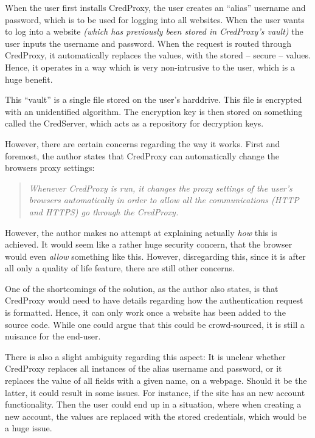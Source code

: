 			When the user first installs CredProxy, the user creates an ``alias'' username and password, which is to be used for logging into all websites. When the user wants to log into a website \emph{(which has previously been stored in CredProxy's vault)} the user inputs the username and password. When the request is routed through CredProxy, it automatically replaces the values, with the stored -- secure -- values. Hence, it operates in a way which is very non-intrusive to the user, which is a huge benefit.

			This ``vault'' is a single file stored on the user's harddrive. This file is encrypted with an unidentified algorithm. The encryption key is then stored on something called the CredServer, which acts as a repository for decryption keys.

			However, there are certain concerns regarding the way it works. First and foremost, the author states that CredProxy can automatically change the browsers proxy settings:
			\begin{quote}
				\emph{Whenever CredProxy is run, it changes the proxy settings of the user’s browsers automatically
						in order to allow all the communications (HTTP and HTTPS) go through the CredProxy.}\\\cite[p.53]{golrang2012}
			\end{quote}

			However, the author makes no attempt at explaining actually \emph{how} this is achieved. It would seem like a rather huge security concern, that the browser would even \emph{allow} something like this. However, disregarding this, since it is after all only a quality of life feature, there are still other concerns.

			One of the shortcomings of the solution, as the author also states, is that CredProxy would need to have details regarding how the authentication request is formatted. Hence, it can only work once a website has been added to the source code. While one could argue that this could be crowd-sourced, it is still a nuisance for the end-user. 

			There is also a slight ambiguity regarding this aspect: It is unclear whether CredProxy replaces all instances of the alias username and password, or it replaces the value of all fields with a given name, on a webpage. Should it be the latter, it could result in some issues. For instance, if the site has an new account functionality. Then the user could end up in a situation, where when creating a new account, the values are replaced with the stored credentials, which would be a huge issue.

